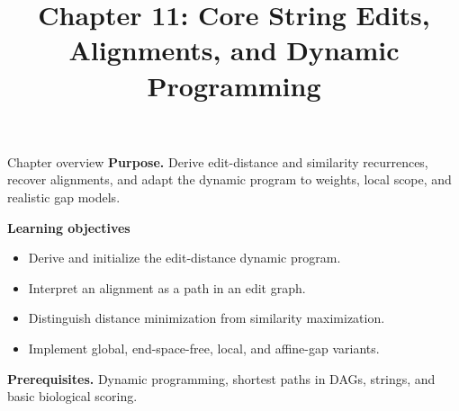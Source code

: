 \documentclass[11pt,letterpaper]{article}
\title{Chapter 11: Core String Edits, Alignments, and Dynamic Programming}
\author{}
\date{}
\begin{document}
\maketitle

\begin{CornellOverviewBox}{Chapter overview}
\textbf{Purpose.} Derive edit-distance and similarity recurrences, recover alignments, and adapt the dynamic program to weights, local scope, and realistic gap models.

\textbf{Learning objectives}
\begin{itemize}
  \item Derive and initialize the edit-distance dynamic program.
  \item Interpret an alignment as a path in an edit graph.
  \item Distinguish distance minimization from similarity maximization.
  \item Implement global, end-space-free, local, and affine-gap variants.
\end{itemize}

\textbf{Prerequisites.} Dynamic programming, shortest paths in DAGs, strings, and basic biological scoring.
\end{CornellOverviewBox}
\end{document}
